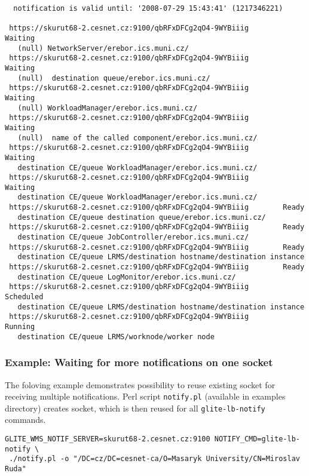 \begin{verbatim}
  notification is valid until: '2008-07-29 15:43:41' (1217346221)

 https://skurut68-2.cesnet.cz:9100/qbRFxDFCg2qO4-9WYBiiig        Waiting
   (null) NetworkServer/erebor.ics.muni.cz/
 https://skurut68-2.cesnet.cz:9100/qbRFxDFCg2qO4-9WYBiiig        Waiting
   (null)  destination queue/erebor.ics.muni.cz/
 https://skurut68-2.cesnet.cz:9100/qbRFxDFCg2qO4-9WYBiiig        Waiting
   (null) WorkloadManager/erebor.ics.muni.cz/
 https://skurut68-2.cesnet.cz:9100/qbRFxDFCg2qO4-9WYBiiig        Waiting
   (null)  name of the called component/erebor.ics.muni.cz/
 https://skurut68-2.cesnet.cz:9100/qbRFxDFCg2qO4-9WYBiiig        Waiting
   destination CE/queue WorkloadManager/erebor.ics.muni.cz/
 https://skurut68-2.cesnet.cz:9100/qbRFxDFCg2qO4-9WYBiiig        Waiting
   destination CE/queue WorkloadManager/erebor.ics.muni.cz/
 https://skurut68-2.cesnet.cz:9100/qbRFxDFCg2qO4-9WYBiiig        Ready
   destination CE/queue destination queue/erebor.ics.muni.cz/
 https://skurut68-2.cesnet.cz:9100/qbRFxDFCg2qO4-9WYBiiig        Ready
   destination CE/queue JobController/erebor.ics.muni.cz/
 https://skurut68-2.cesnet.cz:9100/qbRFxDFCg2qO4-9WYBiiig        Ready
   destination CE/queue LRMS/destination hostname/destination instance
 https://skurut68-2.cesnet.cz:9100/qbRFxDFCg2qO4-9WYBiiig        Ready
   destination CE/queue LogMonitor/erebor.ics.muni.cz/
 https://skurut68-2.cesnet.cz:9100/qbRFxDFCg2qO4-9WYBiiig        Scheduled
   destination CE/queue LRMS/destination hostname/destination instance
 https://skurut68-2.cesnet.cz:9100/qbRFxDFCg2qO4-9WYBiiig        Running
   destination CE/queue LRMS/worknode/worker node

\end{verbatim}


\subsubsection{Example: Waiting for more notifications on one socket}

The foloving example demonstrates possibility to reuse existing socket for receiving
multiple notifications. Perl script \verb'notify.pl' (available in 
examples directory) creates socket, which is then reused for all
\verb'glite-lb-notify' commands.

\begin{verbatim}
GLITE_WMS_NOTIF_SERVER=skurut68-2.cesnet.cz:9100 NOTIFY_CMD=glite-lb-notify \
 ./notify.pl -o "/DC=cz/DC=cesnet-ca/O=Masaryk University/CN=Miroslav Ruda"
\end{verbatim}

